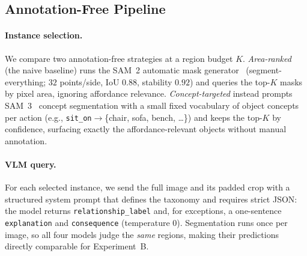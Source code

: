 \documentclass[runningheads]{llncs}
\begin{document}
\subsection{Annotation-Free Pipeline}
\label{sec:pipeline}

\paragraph{Instance selection.}
We compare two annotation-free strategies at a region budget $K$.
\emph{Area-ranked} (the naive baseline) runs the SAM~2 automatic mask generator~\cite{ravi2025sam2} (segment-everything; $32$ points/side, IoU $0.88$, stability $0.92$) and queries the top-$K$ masks by pixel area, ignoring affordance relevance.
\emph{Concept-targeted} instead prompts SAM~3~\cite{sam3} concept segmentation with a small fixed vocabulary of object concepts per action (e.g., \texttt{sit\_on}$\to$\{chair, sofa, bench, \dots\}) and keeps the top-$K$ by confidence, surfacing exactly the affordance-relevant objects without manual annotation.

\paragraph{VLM query.}
For each selected instance, we send the full image and its padded crop with a structured system prompt that defines the taxonomy and requires strict JSON: the model returns \texttt{relationship\_label} and, for exceptions, a one-sentence \texttt{explanation} and \texttt{consequence} (temperature $0$).
Segmentation runs once per image, so all four models judge the \emph{same} regions, making their predictions directly comparable for Experiment~B.

\end{document}
